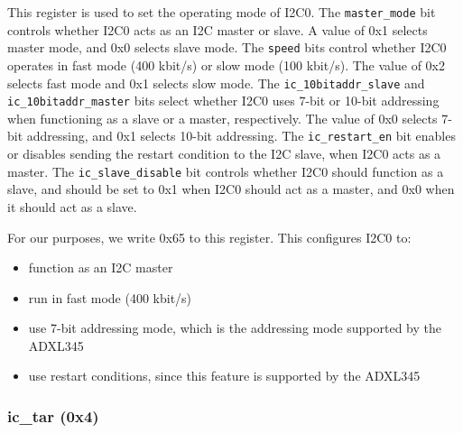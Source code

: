 \documentclass[11pt, twoside, pdftex]{article}
\begin{document}
This register is used to set the operating mode of I2C0. The \texttt{master\_mode} bit controls whether I2C0 acts as an I2C master or slave. A value of 0x1 selects master mode, and 0x0 selects slave mode. The \texttt{speed} bits control whether I2C0 operates in fast mode (400 kbit/s) or slow mode (100 kbit/s). The value of 0x2 selects fast mode and 0x1 selects slow mode. The \texttt{ic\_10bitaddr\_slave} and \texttt{ic\_10bitaddr\_master} bits select whether I2C0 uses 7-bit or 10-bit addressing when functioning as a slave or a master, respectively. The value of 0x0 selects 7-bit addressing, and 0x1 selects 10-bit addressing. The \texttt{ic\_restart\_en} bit enables or disables sending the restart condition to the I2C slave, when I2C0 acts as a master. The \texttt{ic\_slave\_disable} bit controls whether I2C0 should function as a slave, and should be set to 0x1 when I2C0 should act as a master, and 0x0 when it should act as a slave.

\pagebreak

For our purposes, we write 0x65 to this register. This configures I2C0 to:
\vspace{-5mm}
\begin{itemize} \itemsep0pt \parskip0pt 
	\item function as an I2C master
	\item run in fast mode (400 kbit/s)
	\item use 7-bit addressing mode, which is the addressing mode supported by the ADXL345
	\item use restart conditions, since this feature is supported by the ADXL345
\end{itemize}


\subsubsection{ic\_tar (0x4)}
\end{document}
